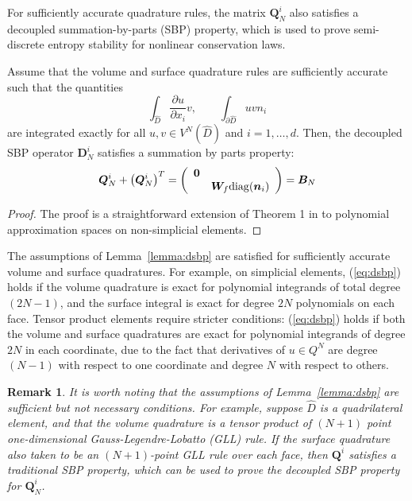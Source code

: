 \documentclass[review]{siamart0216}
\newtheorem*{remark}{Remark}
\theoremstyle{assumption}
\renewcommand{\hat}[1]{\hat{#1}}
\newcommand{\pd}[2]{\frac{\partial#1}{\partial#2}}
\newcommand{\LRp}[1]{\left( #1 \right)}
\renewcommand{\hat}{\widehat}
\begin{document}
For sufficiently accurate quadrature rules, the matrix $\bm{Q}^i_N$ also satisfies a decoupled summation-by-parts (SBP) property, which is used to prove semi-discrete entropy stability for nonlinear conservation laws.  
\begin{lemma}
Assume that the volume and surface quadrature rules are sufficiently accurate such that the quantities
\[
\int_{\hat{D}} \pd{u}{x_i} v, \qquad \int_{\partial \hat{D}} u v n_i
\]
are integrated exactly for all $u,v \in V^N\LRp{\hat{D}}$ and $i = 1,\ldots, d$.  Then, the decoupled SBP operator $\bm{D}^i_N$ satisfies a summation by parts property:
\begin{gather}
\bm{Q}^i_N+\LRp{\bm{Q}^i_N}^T = \LRp{\begin{array}{cc}\bm{0}&\\ & \bm{W}_f {\rm diag}(\bm{n}_i)\end{array}} = \bm{B}_N\label{eq:dsbp}
\end{gather}
\label{lemma:dsbp}
\end{lemma}
\begin{proof}
The proof is a straightforward extension of Theorem 1 in \cite{chan2017discretely} to polynomial approximation spaces on non-simplicial elements.  
\end{proof}

The assumptions of Lemma~\ref{lemma:dsbp} are satisfied for sufficiently accurate volume and surface quadratures.  For example, on simplicial elements, (\ref{eq:dsbp}) holds if the volume quadrature is exact for polynomial integrands of total degree $(2N-1)$, and the surface integral is exact for degree $2N$ polynomials on each face.  Tensor product elements require stricter conditions: (\ref{eq:dsbp}) holds if both the volume and surface quadratures are exact for polynomial integrands of degree $2N$ in each coordinate, due to the fact that derivatives of $u\in Q^N$ are degree $(N-1)$ with respect to one coordinate and degree $N$ with respect to others.  

\begin{remark}
It is worth noting that the assumptions of Lemma~\ref{lemma:dsbp} are sufficient but not necessary conditions.  For example, suppose $\hat{D}$ is a quadrilateral element, and that the volume quadrature is a tensor product of $(N+1)$ point one-dimensional Gauss-Legendre-Lobatto (GLL) rule.  If the surface quadrature also taken to be an $(N+1)$-point GLL rule over each face, then $\bm{Q}^i$ satisfies a traditional SBP property, which can be used to prove the decoupled SBP property for $\bm{Q}^i_N$.  
\end{remark}
\end{document}
